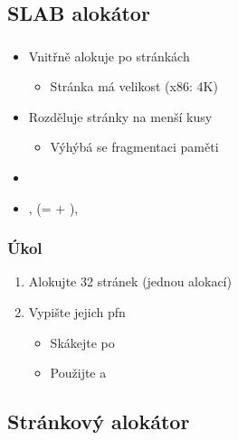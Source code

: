 \iffimuni
\subsection{SLAB alokátor}
\fi

\begin{frame}
  \frametitle{}

  \begin{itemize}
    \item Vnitřně alokuje po stránkách
    \begin{itemize}
      \item Stránka má velikost  (x86: 4K)
    \end{itemize}
    \item Rozděluje stránky na menší kusy
    \begin{itemize}
    \item Výhýbá se fragmentaci paměti
    \end{itemize}
    \item {}
    \item {},  (=  +
      ), 
  \end{itemize}

\end{frame}

\begin{frame}
  \frametitle{Úkol}


  \begin{enumerate}
    \item Alokujte 32 stránek (jednou alokací)
    \item Vypište jejich pfn
    \begin{itemize}
      \item Skákejte po 
      \item Použijte  a 
    \end{itemize}
  \end{enumerate}

\end{frame}

\iffimuni
\subsection{Stránkový alokátor}
\fi

